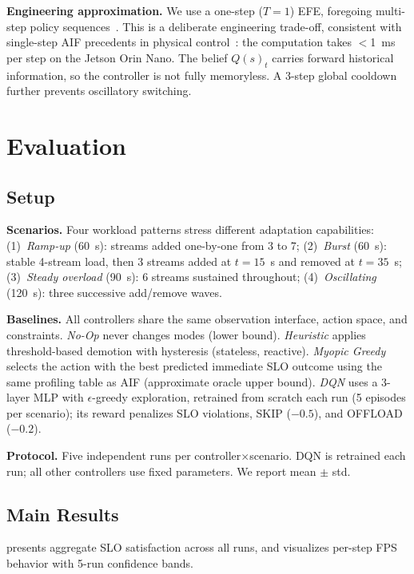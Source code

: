 \documentclass[conference]{IEEEtran}
\begin{document}
\textbf{Engineering approximation.}
We use a one-step ($T=1$) EFE, foregoing multi-step policy sequences~\cite{parr2022active}.
This is a deliberate engineering trade-off, consistent with single-step AIF precedents in physical control~\cite{friston2016robot}: the computation takes $<$1~ms per step on the Jetson Orin Nano.
The belief $Q(s)_t$ carries forward historical information, so the controller is not fully memoryless.
A 3-step global cooldown further prevents oscillatory switching.

\section{Evaluation}
\label{sec:results}

\subsection{Setup}

\textbf{Scenarios.}
Four workload patterns stress different adaptation capabilities:
(1)~\emph{Ramp-up} (60~s): streams added one-by-one from 3 to 7;
(2)~\emph{Burst} (60~s): stable 4-stream load, then 3 streams added at $t=15$~s and removed at $t=35$~s;
(3)~\emph{Steady overload} (90~s): 6 streams sustained throughout;
(4)~\emph{Oscillating} (120~s): three successive add/remove waves.

\textbf{Baselines.}
All controllers share the same observation interface, action space, and constraints.
\emph{No-Op} never changes modes (lower bound).
\emph{Heuristic} applies threshold-based demotion with hysteresis (stateless, reactive).
\emph{Myopic Greedy} selects the action with the best predicted immediate SLO outcome using the same profiling table as AIF (approximate oracle upper bound).
\emph{DQN} uses a 3-layer MLP with $\epsilon$-greedy exploration, retrained from scratch each run (5 episodes per scenario); its reward penalizes SLO violations, SKIP ($-0.5$), and OFFLOAD ($-0.2$).

\textbf{Protocol.}
Five independent runs per controller$\times$scenario. DQN is retrained each run; all other controllers use fixed parameters. We report mean $\pm$ std.

\subsection{Main Results}

 presents aggregate SLO satisfaction across all runs, and  visualizes per-step FPS behavior with 5-run confidence bands.
\end{document}
